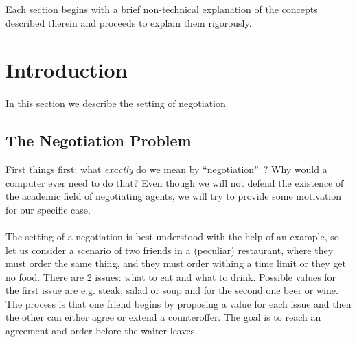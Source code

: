 \documentclass[12pt]{article}
\numberwithin{equation}{section}
\newcommand{\quotes}[1]{\textquotedblleft #1\textquotedblright \ }
\begin{document}
			Each section begins with a brief non-technical explanation of the concepts described therein and proceeds to explain them rigorously.

	\newpage

	\tableofcontents

	\newpage

	\section{Introduction}		\label{sec:introduction}

		\paragraph*{}
		In this section we describe the setting of negotiation 


		\subsection{The Negotiation Problem}	\label{sec:introduction.the_negotiation_problem}	%
			First things first: what \emph{exactly} do we mean by \quotes{negotiation}? Why would a computer ever need to do that? Even though we will not defend the existence of the academic field of negotiating agents, we will try to provide some motivation for our specific case.	%


			\paragraph*{}

				The setting of a negotiation is best understood with the help of an example, so let us consider a scenario of two friends in a (peculiar) restaurant, where they must order the same thing, and they must order withing a time limit or they get no food. There are 2 issues: what to eat and what to drink. Possible values for the first issue are e.g. steak, salad or soup and for the second one beer or wine. The process is that one friend begins by proposing a value for each issue and then the other can either agree or extend a counteroffer. The goal is to reach an agreement and order before the waiter leaves.
			
\end{document}
